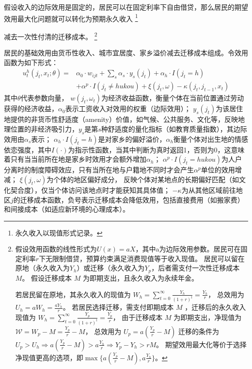 \documentclass[a4paper, zihao=-4, fontset = mac, oneside]{ctexbook} %
\let\oldfootnote\footnote
\renewcommand{\footnote}[1]{%
  \oldfootnote{\setstretch{1.5}#1}%
}
\begin{document}
假设收入的边际效用是固定的，居民可以在固定利率下自由借贷，那么居民的期望效用最大化问题就可以转化为预期永久收入\footnote{永久收入以现值形式记录。}
减去一次性付清的迁移成本。
\footnote{
假设效用函数的线性形式为$U(x)=a X$，其中a为边际效用参数。居民可在固定利率$r$下无限制借贷，预算约束满足消费现值等于收入现值。
居民可以留在原地（永久收入为$Y_h$）或迁移（永久收入为$Y_p$，后者需支付一次性迁移成本 $M$。
假设迁移成本 
$M$
为即期支出，且永久收入为永续年金。

若居民留在原地，其永久收入的现值为
$W_h = \sum\limits_{t=0}^\infty \frac{Y_h}{(1+r)^t}=\frac{Y_h}{r}$，
总效用为$U_h=a W_h = \frac{a Y_h}{r}$。
若居民选择迁移，需支付即期成本 
$M$
，迁移后的永久收入现值为
$W_h = \sum\limits_{t=0}^\infty \frac{Y_p}{(1+r)^t}=\frac{Y_p}{r}$，
由于迁移成本 
$M$
为即期支出，净现值为
$\mathcal{W}=W_p-M=\frac{Y_p}{r}-M$，
总效用为
$U_p=a(\frac{Y_p}{r}-M)$
迁移的条件为$U_p>U_h \Rightarrow a(\frac{Y_p}{r}-M) > a \frac{ Y_h}{r} \Rightarrow Y_p-Y_h > rM$。
期望效用最大化等价于选择净现值更高的选项，即$\max\{a(\frac{Y_p}{r}-M), a \frac{ Y_h}{r}\}$。
}
居民的基础效用由货币性收入、城市宜居度、家乡溢价减去迁移成本组成。令效用函数为如下形式：
\begin{equation}
  \begin{split}
    u_t^h(j_t,x_t;\theta)=&\alpha_0 \cdot w_{ijt}+\sum\limits_{s} \alpha_{s} \cdot y_{s}(j_t)  + \alpha_h \cdot I(j_t=h) 
    \\& + \alpha^p \cdot I(j_t \neq hukou) +\xi(j_t,\omega)-\kappa(j_t,j_{t-1},x_t)
  \end{split}
  \label{eq:家乡效用函数中的具体构成}
\end{equation}
其中$\theta$代表参数向量， $w(j_t,\omega_t)$为经济收益函数，衡量个体在当前位置通过劳动获得的经济收益，$\alpha_0$表示工资收入对效用的权重（边际效用）；
$y_{s}(j_t)$为该居住地提供的非货币性舒适度（amenity）价值，如气候、公共服务、文化等，反映地理位置的非经济吸引力，$y_s$是第$s$种舒适度的量化指标（如教育质量指数），其边际效用由$\alpha_s$表示；
$\alpha_h \cdot I(j_t=h)$是对家乡的偏好溢价，$\alpha_h$衡量个体对出生地的情感依恋强度，其中$I(\cdot)$为指示性函数，当其中判断为真时返回1，否则为0，这意味着只有当当前所在地是家乡时效用才会额外增加$\alpha_h$；
$\alpha^p \cdot I(j_t = hukou)$为人户分离时的制度障碍效应，只有当所在地与户籍地不同时才会产生$\alpha^p$单位的效用增减；
$\xi(j_t,\omega)$为个体的地区偏好成分，
反映个体对某地点的长期偏好匹配（如文化契合度），仅当个体访问该地点时才能获知其具体值；
$-\kappa$为从其他区域前往地区$j$的迁移成本函数，负号表示迁移成本会降低效用，包括直接费用（如搬家费）和间接成本（如适应新环境的心理成本）。
\end{document}
